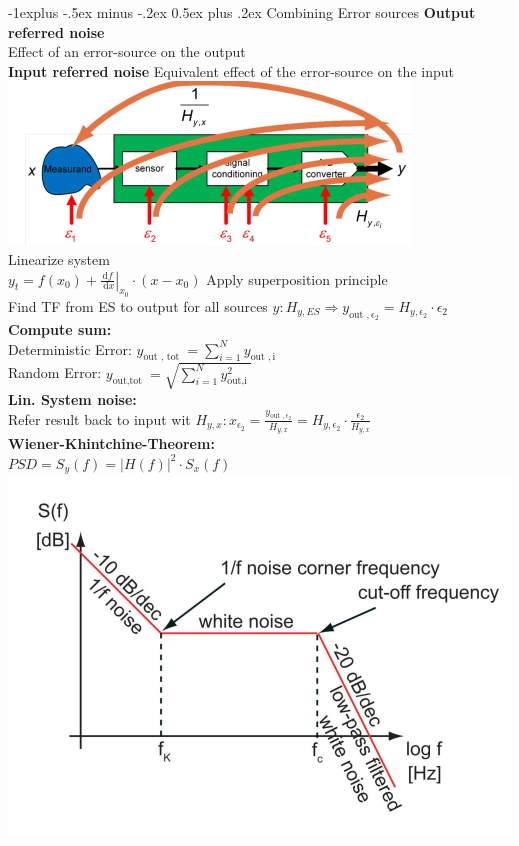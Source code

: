 \documentclass[5pt]{article}
\makeatletter
\renewcommand{\subsection}{\@startsection{subsection}{2}{0mm}%
                                {-1explus -.5ex minus -.2ex}%
                                {0.5ex plus .2ex}%
                                {\normalfont\normalsize\bfseries}}
\makeatother
\begin{document}
\begin{multicols*}{4}
\subsection{Combining Error sources}
\textbf{Output referred noise}\\
Effect of an error-source on the output\\
\textbf{Input referred noise}
Equivalent effect of the error-source on the input\\
\includegraphics[width = \columnwidth]{images/error_referral.png}\\
Linearize system\\
$ y_{t}=f\left(x_{0}\right)+\left.\frac{\mathrm{d} f}{\mathrm{~d} x}\right|_{x_{0}} \cdot\left(x-x_{0}\right) $
Apply superposition principle\\
Find TF from ES to output for all sources $ y:H_{y,ES} \Rightarrow y_{\text {out }, \epsilon_{2}}=H_{y, \epsilon_{2}} \cdot \epsilon_{2}$\\
\textbf{Compute sum:}\\
Deterministic Error: $ y_{\text {out }, \text { tot }}=\sum_{i=1}^{N} y_{\text {out }, \mathrm{i}} $\\
Random Error: $ y_{\text {out,tot }}=\sqrt{\sum_{i=1}^{N} y_{\text {out,i }}^{2}} $\\
\textbf{Lin. System noise:}\\
Refer result back to input wit $ H_{y,x}: x_{\epsilon_{2}}=\frac{y_{\text {out }, \epsilon_{2}}}{H_{y, x}}=H_{y, \epsilon_{2}} \cdot \frac{\epsilon_{2}}{H_{y, x}} $\\
\textbf{Wiener-Khintchine-Theorem:}\\
$ PSD =  S_{y}(f)=|H(f)|^{2} \cdot S_{x}(f)$
\includegraphics[width = 0.8\columnwidth]{images/noise_bode.png}

\end{multicols*}
\end{document}
